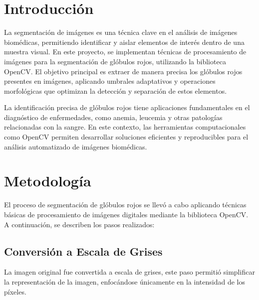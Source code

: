 \documentclass[journal]{IEEEtran}
\begin{document}



\section{Introducción}
% 
% 
% 
% 
\IEEEPARstart
{L}{a} segmentación de imágenes es una técnica clave en el análisis de imágenes biomédicas, permitiendo identificar y aislar elementos de interés dentro de una muestra visual. En este proyecto, se implementan técnicas de procesamiento de imágenes para la segmentación de glóbulos rojos, utilizando la biblioteca OpenCV. El objetivo principal es extraer de manera precisa los glóbulos rojos presentes en imágenes, aplicando umbrales adaptativos y operaciones morfológicas que optimizan la detección y separación de estos elementos.

La identificación precisa de glóbulos rojos tiene aplicaciones fundamentales en el diagnóstico de enfermedades, como anemia, leucemia y otras patologías relacionadas con la sangre. En este contexto, las herramientas computacionales como OpenCV permiten desarrollar soluciones eficientes y reproducibles para el análisis automatizado de imágenes biomédicas.

\section{Metodología}
El proceso de segmentación de glóbulos rojos se llevó a cabo aplicando técnicas básicas de procesamiento de imágenes digitales mediante la biblioteca OpenCV. A continuación, se describen los pasos realizados:
\subsection{Conversión a Escala de Grises}
La imagen original fue convertida a escala de grises, este paso permitió simplificar la representación de la imagen, enfocándose únicamente en la intensidad de los píxeles.
\end{document}
